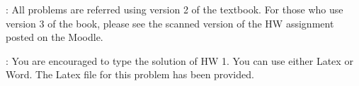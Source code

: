 \documentclass[11pt,letterpaper]{article}
\begin{document}
: All problems are referred using version 2 of the textbook. For those who use version 3 of the book, please see the scanned version of the HW assignment posted on the Moodle. 

: You are encouraged to type the solution of HW 1. You can use either Latex or Word. The Latex file for this problem has been provided. 
\end{document}
